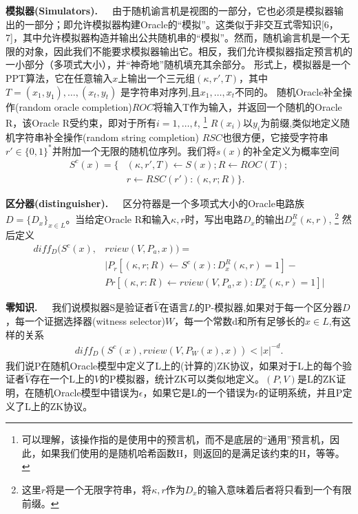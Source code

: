 \documentclass[]{article}
\begin{document}
    
    \textbf{模拟器(Simulators).}\ \ \ 
    由于随机谕言机是视图的一部分，它也必须是模拟器输出的一部分；即允许模拟器构建Oracle的“模拟”。这类似于非交互式零知识[6，7]，其中允许模拟器构造并输出公共随机串的“模拟”。然而，随机谕言机是一个无限的对象，因此我们不能要求模拟器输出它。相反，我们允许模拟器指定预言机的一小部分（多项式大小），并“神奇地”随机填充其余部分。
    形式上，模拟器是一个PPT算法，它在任意输入$x$上输出一个三元组$(\kappa,r',T)$，其中$T=(x_1,y_1),\ldots,(x_t,y_t)$ 是字符串对序列,且$x_1,\ldots,x_t$不同的。
    随机Oracle补全操作(random oracle completion)$ROC$将输入T作为输入，并返回一个随机的Oracle R，该Oracle R受约束，即对于所有$i=1,\ldots,t$,
    \footnote{可以理解，该操作指的是使用中的预言机，而不是底层的“通用”预言机，因此，如果我们使用的是随机哈希函数H，则返回的是满足该约束的H，等等。} $R(x_i)$以$y_i$为前缀,类似地定义随机字符串补全操作(random string completion) $RSC$也很方便，它接受字符串$r'\in \{0,1\}^*$并附加一个无限的随机位序列。我们将$s(x)$的补全定义为概率空间
    \begin{align*}
    	S^c(x)=\{&(\kappa,r',T)\leftarrow S(x);R\leftarrow ROC(T);\\
    	         &r\leftarrow RSC(r'):(\kappa,r;R)\}.
    \end{align*}
    
    
    \textbf{区分器(distinguisher).}\ \ \ 
    区分符器是一个多项式大小的Oracle电路族$D=\{D_x\}_{x\in L}$。当给定Oracle R和输入$\kappa,r$时，写出电路$D_x$的输出$D_x^R(\kappa,r)$,
    \footnote{这里$r$将是一个无限字符串，将$\kappa,r$作为$D_x$的输入意味着后者将只看到一个有限前缀。}
    然后定义
    \begin{align*}
    	diff_D(S^c(x),&rview(V,P_a,x))=\\
    	              &|P_r[(\kappa,r;R)\leftarrow S^c(x):D_x^R(\kappa,r)=1]-\\
    	              &Pr[(\kappa,r:R)\leftarrow rview(V,P_a,x):D_x^r(\kappa,r)=1]|
    \end{align*}
    
    
    \textbf{零知识.}\ \ \ 
    我们说模拟器S是验证者$\hat{V}$在语言$L$的P-模拟器,如果对于每一个区分器$D$，每一个证据选择器(witness selector)$W$，每一个常数d和所有足够长的$x\in L$,有这样的关系
    \begin{align*}
    	diff_D(S^c(x),rview(V,P_W(x),x))<|x|^{-d}.
    \end{align*}
    我们说P在随机Oracle模型中定义了L上的(计算的)ZK协议，如果对于L上的每个验证者$\hat{V}$存在一个L上的$\hat{V}$的P模拟器，统计ZK可以类似地定义。$(P,V)$是L的ZK证明，在随机Oracle模型中错误为$\epsilon$，如果它是L的一个错误为$\epsilon$的证明系统，并且P定义了L上的ZK协议。
    
\end{document}
